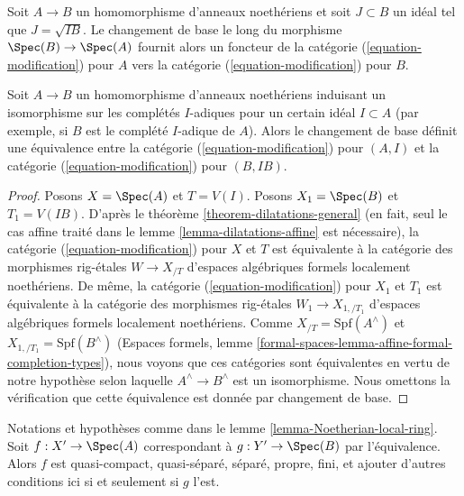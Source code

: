 \medskip\noindent
Soit $A \to B$ un homomorphisme d'anneaux noethériens et soit $J \subset B$
un idéal tel que $J = \sqrt{I B}$. Le changement de base le long du
morphisme $\Spec(B) \to \Spec(A)$ fournit alors un foncteur
de la catégorie (\ref{equation-modification}) pour $A$
vers la catégorie (\ref{equation-modification}) pour $B$.

\begin{lemma}
\label{lemma-Noetherian-local-ring}
Soit $A \to B$ un homomorphisme d'anneaux noethériens induisant un
isomorphisme sur les complétés $I$-adiques pour un certain idéal $I \subset A$
(par exemple, si $B$ est le complété $I$-adique de $A$).
Alors le changement de base définit une équivalence entre la
catégorie (\ref{equation-modification}) pour $(A, I)$
et la catégorie (\ref{equation-modification}) pour $(B, IB)$.
\end{lemma}

\begin{proof}
Posons $X = \Spec(A)$ et $T = V(I)$.
Posons $X_1 = \Spec(B)$ et $T_1 = V(IB)$.
D'après le théorème \ref{theorem-dilatations-general} (en fait, seul le cas
affine traité dans le lemme \ref{lemma-dilatations-affine} est nécessaire),
la catégorie (\ref{equation-modification}) pour $X$ et $T$
est équivalente à la catégorie des morphismes rig-étales
$W \to X_{/T}$ d'espaces algébriques formels localement noethériens.
De même, la catégorie (\ref{equation-modification})
pour $X_1$ et $T_1$ est équivalente à la catégorie des morphismes rig-étales
$W_1 \to X_{1, /T_1}$ d'espaces algébriques formels localement
noethériens. Comme $X_{/T} = \text{Spf}(A^\wedge)$
et $X_{1, /T_1} = \text{Spf}(B^\wedge)$ (Espaces formels, lemme
\ref{formal-spaces-lemma-affine-formal-completion-types}), nous voyons que
ces catégories sont équivalentes en vertu de notre hypothèse selon laquelle
$A^\wedge \to B^\wedge$ est un isomorphisme. Nous omettons la vérification
que cette équivalence est donnée par changement de base.
\end{proof}

\begin{lemma}
\label{lemma-Noetherian-local-ring-properties}
Notations et hypothèses comme dans le lemme \ref{lemma-Noetherian-local-ring}.
Soit $f : X' \to \Spec(A)$ correspondant à $g : Y' \to \Spec(B)$
par l'équivalence. Alors $f$ est quasi-compact, quasi-séparé, séparé,
propre, fini, et ajouter d'autres conditions ici si et seulement si $g$ l'est.
\end{lemma}

